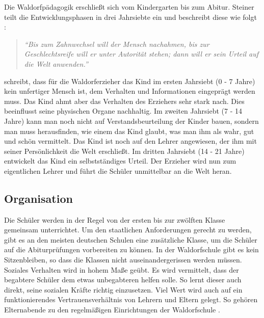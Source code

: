 Die Waldorfpädagogik erschließt sich vom Kindergarten bis zum Abitur. Steiner teilt die Entwicklungsphasen in drei Jahrsiebte ein und beschreibt diese wie folgt \citep[S. 139]{steiner10}:

\begin{quotation}
			\emph{\enquote{Bis zum Zahnwechsel will der Mensch nachahmen, bis zur Geschlechtsreife will er unter Autorität stehen; dann will er sein Urteil auf die Welt anwenden.}}
\end{quotation}

\citet{kiersch07} schreibt, dass für die Waldorferzieher das Kind im ersten Jahrsiebt (0 - 7 Jahre) kein unfertiger Mensch ist, dem Verhalten und Informationen eingeprägt werden muss. Das Kind ahmt aber das Verhalten des Erziehers sehr stark nach. Dies beeinflusst seine physischen Organe nachhaltig. Im zweiten Jahrsiebt (7 - 14 Jahre) kann man noch nicht auf Verstandsbeurteilung der Kinder bauen, sondern man muss herausfinden, wie einem das Kind glaubt, was man ihm als wahr, gut und schön vermittelt. Das Kind ist noch auf den Lehrer angewiesen, der ihm mit seiner Persönlichkeit die Welt erschließt. Im dritten Jahrsiebt (14 - 21 Jahre) entwickelt das Kind ein selbstständiges Urteil. Der Erzieher wird nun zum eigentlichen Lehrer und führt die Schüler unmittelbar an die Welt heran. 

\subsection{Organisation} %
\label{sub:organisation}

Die Schüler werden in der Regel von der ersten bis zur zwölften Klasse gemeinsam unterrichtet. Um den staatlichen Anforderungen gerecht zu werden, gibt es an den meisten deutschen Schulen eine zusätzliche Klasse, um die Schüler auf die Abiturprüfungen vorbereiten zu können. In der Waldorfschule gibt es kein Sitzenbleiben, so dass die Klassen nicht auseinandergerissen werden müssen. Soziales Verhalten wird in hohem Maße geübt. Es wird vermittelt, dass der begabtere Schüler dem etwas unbegabteren helfen solle. So lernt dieser auch direkt, seine sozialen Kräfte richtig einzusetzen. Viel Wert wird auch auf ein funktionierendes Vertrauensverhältnis von Lehrern und Eltern gelegt. So gehören Elternabende zu den regelmäßigen Einrichtungen der Waldorfschule \citep[vgl.][]{kiersch07, hemleben63}.

